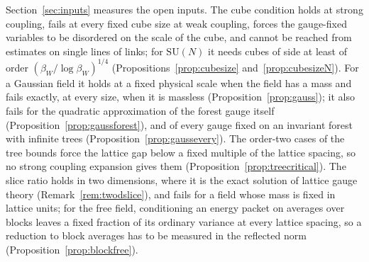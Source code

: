 \documentclass[11pt]{amsart}
\theoremstyle{definition}
\theoremstyle{remark}
\numberwithin{equation}{section}
\newcommand{\SU}{\mathrm{SU}}
\begin{document}
Section~\ref{sec:inputs} measures the open inputs. The cube condition holds
at strong coupling, fails at every fixed cube size at weak coupling, forces
the gauge-fixed variables to be disordered on the scale of the cube, and
cannot be reached from estimates on single lines of links; for $\SU(N)$ it
needs cubes of side at least of order $(\beta_W/\log\beta_W)^{1/4}$
(Propositions~\ref{prop:cubesize} and~\ref{prop:cubesizeN}). For a Gaussian
field it holds at a fixed physical scale when the field has a mass and fails
exactly, at every size, when it is massless (Proposition~\ref{prop:gauss});
it also fails for the quadratic approximation of the forest gauge itself
(Proposition~\ref{prop:gaussforest}), and of every gauge fixed on an
invariant forest with infinite trees (Proposition~\ref{prop:gaussevery}). The order-two cases of the tree bounds
force the lattice gap below a fixed multiple of the lattice spacing, so no
strong coupling expansion gives them (Proposition~\ref{prop:treecritical}).
The slice ratio holds in two dimensions, where it is the exact solution of
lattice gauge theory (Remark~\ref{rem:twodslice}), and fails for a field
whose mass is fixed in lattice units; for the free field, conditioning an
energy packet on averages over blocks leaves a fixed fraction of its ordinary
variance at every lattice spacing, so a reduction to block averages has to be
measured in the reflected norm (Proposition~\ref{prop:blockfree}).
\end{document}
